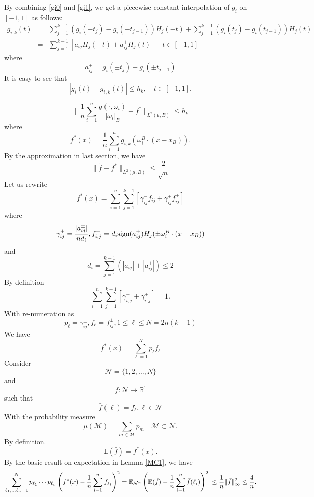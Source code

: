By combining \eqref{gi0} and \eqref{gi1}, we get a piecewise constant
interpolation of $g_i$ on $[-1,1]$ as follows:
\begin{eqnarray}
g_{i,k}(t)&=&
\sum_{j=1}^{k-1}(g_i(-t_j) - g_i(-t_{j-1}))H_j(-t)+\sum_{j=1}^{k-1}(g_i(t_j) - g_i(t_{j-1})) H_{j}(t)\nonumber \\ 
&=&\sum_{j=1}^{k-1}[a_{ij}^-H_j(-t)+a_{ij}^+H_{j}(t)] \label{gih}
\quad t\in [-1,1]
\end{eqnarray}
where 
$$
a_{ij}^{\pm}=g_i(\pm t_j) - g_i(\pm t_{j-1})
$$
It is easy to see that
\begin{equation}
|g_i(t)-g_{i,k}(t)|\le h_k, \quad t\in [-1,1].
\end{equation} 

\begin{equation}
\|\frac1n \sum_{i=1}^n \frac{g(\cdot,\omega_i)}{|\omega_i|_B}-f^*\|_{L^2(\mu,B)}\le h_k
\end{equation}
where
\begin{equation}
  \label{fstar}
f^*(x)=
\frac1n\sum_{i=1}^ng_{i,k}(\omega_i^B\cdot (x-x_B)).
\end{equation}
By the approximation in last section, we have 
\begin{equation}
  \|\tilde f-f^*\|_{L^2(\mu,B)}\le \frac{2}{\sqrt{n}}
\end{equation}
Let us rewrite
$$
f^*(x)
=\sum_{i=1}^n\sum_{j=1}^{k-1}[\gamma_{ij}^- f_{ij}^-+ \gamma_{ij}^+f_{ij}^+]
$$
where
$$
\gamma_{ij}^{\pm}=\frac{|a^\pm_{ij}|}{nd_i}, 
f^\pm_{i,j}=d_i\/{\rm sign}(a^\pm_{ij})H_j(\pm \omega_i^B\cdot (x-x_B))
$$
and 
$$
d_i=\sum_{j=1}^{k-1}(|a^-_{ij}|+|a^+_{ij}|)\le 2
$$
By definition
\begin{equation}
  \label{gammaij}
\sum_{i=1}^n\sum_{j=1}^{k-1}[\gamma_{i,j}^-+\gamma_{i,j}^+]=1.
\end{equation}
With re-numeration as
$$
p_\ell=\gamma_{ij}^{\pm}, f_\ell = f_{ij}^{\pm}, 1\le \ell \le N=2n(k-1)
$$
We have
$$
f^*(x)=\sum_{\ell=1}^N p_\ell f_\ell
$$
Consider 
$$
\mathcal N=\{1,2,\ldots, N\}
$$
and 
$$
\bar f: \mathcal N\mapsto \mathbb R^1
$$
such that
$$
\bar  f(\ell)=f_{\ell}, \ell\in \mathcal N
$$
With the probability measure
$$
\mu(\mathcal M)=\sum_{m\in \mathcal M}p_m \quad \mathcal M\subset\mathcal N.
$$
By definition. 
$$
\mathbb E(\bar  f) = f^*(x).
$$
By the basic result on expectation in Lemma \ref{MC1}, we have
$$
\sum_{\ell_1,\ldots \ell_n=1}^Np_{\ell_1}\cdots p_{\ell_n}\left(f^*(x)-
{1\over n}\sum_{i=1}^n f_{\ell_i}\right)^2
=\mathbb E_{\mathcal N^n} \left(\mathbb E(\bar f)-{1\over
    n}\sum_{i=1}^n  \bar  f(\ell_i)\right)^2\\
\le\frac1n \|\bar  f\|_{\infty}^2 \le\frac4n.
$$
